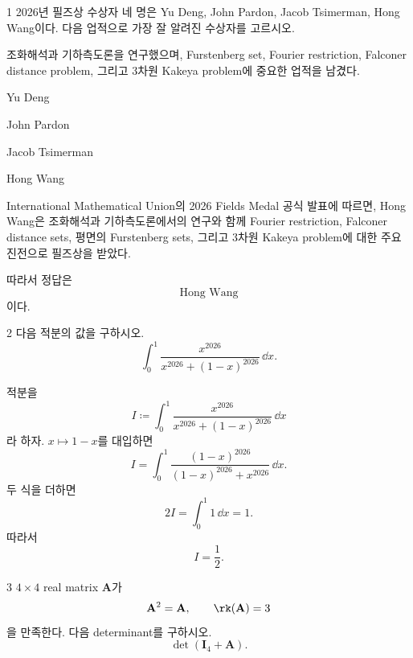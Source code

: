 
\begin{problem}{1}
2026년 필즈상 수상자 네 명은 Yu Deng, John Pardon, Jacob Tsimerman, Hong Wang이다. 다음 업적으로 가장 잘 알려진 수상자를 고르시오.

조화해석과 기하측도론을 연구했으며, Furstenberg set, Fourier restriction, Falconer distance problem, 그리고 3차원 Kakeya problem에 중요한 업적을 남겼다.

\begin{problemchoices}
    \item Yu Deng
    \item John Pardon
    \item Jacob Tsimerman
    \item Hong Wang
\end{problemchoices}
\end{problem}

\begin{solution}
International Mathematical Union의 2026 Fields Medal 공식 발표에 따르면, Hong Wang은 조화해석과 기하측도론에서의 연구와 함께 Fourier restriction, Falconer distance sets, 평면의 Furstenberg sets, 그리고 3차원 Kakeya problem에 대한 주요 진전으로 필즈상을 받았다.

따라서 정답은
\[
    \boxed{\text{Hong Wang}}
\]
이다.
\end{solution}

\begin{problem}{2}
다음 적분의 값을 구하시오.
\[
    \int_0^1
    \frac{x^{2026}}{x^{2026}+(1-x)^{2026}}
    \,\dd x.
\]
\end{problem}

\begin{solution}
적분을
\[
    I\coloneqq \int_0^1
    \frac{x^{2026}}{x^{2026}+(1-x)^{2026}}
    \,\dd x
\]
라 하자. $x\mapsto1-x$를 대입하면
\[
    I=\int_0^1
    \frac{(1-x)^{2026}}{(1-x)^{2026}+x^{2026}}
    \,\dd x.
\]
두 식을 더하면
\[
    2I
    =\int_0^1 1\,\dd x
    =1.
\]
따라서
\[
    \boxed{I=\frac12}.
\]
\end{solution}

\begin{problem}{3}
$4\times4$ real matrix $\mathbf{A}$가
\[
    \mathbf{A}^2=\mathbf{A},
    \qquad
    \rk(\mathbf{A})=3
\]
을 만족한다. 다음 determinant를 구하시오.
\[
    \det\!\left(\mathbf{I}_4+\mathbf{A}\right).
\]
\end{problem}

